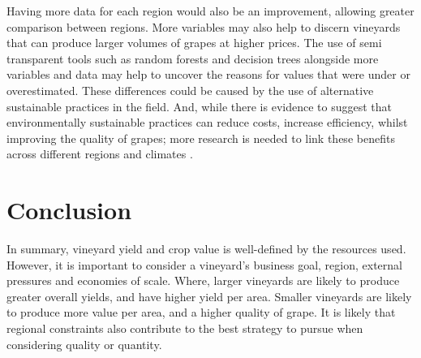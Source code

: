 \documentclass[review,12pt,authoryear]{elsarticle}
\begin{document}
\begin{linenumbers}
Having more data for each region would also be an improvement, allowing greater comparison between regions. More variables may also help to discern vineyards that can produce larger volumes of grapes at higher prices. The use of semi transparent tools such as random forests and decision trees alongside more variables and data may help to uncover the reasons for values that were under or overestimated. These differences could be caused by the use of alternative sustainable practices in the field. And, while there is evidence to suggest that environmentally sustainable practices can reduce costs, increase efficiency, whilst improving the quality of grapes; more research is needed to link these benefits across different regions and climates \citep{baianoOverviewSustainabilityWine2021,marianiSustainableWinegrowingCurrent2015,montalvo-falconSustainabilityResearchWine2023}.
\section{Conclusion}
In summary, vineyard yield and crop value is well-defined by the resources used. However, it is important to consider a vineyard's business goal, region, external pressures and economies of scale. Where, larger vineyards are likely to produce greater overall yields, and have higher yield per area. Smaller vineyards are likely to produce more value per area, and a higher quality of grape. It is likely that regional constraints also contribute to the best strategy to pursue when considering quality or quantity.
%




 \appendix



\end{linenumbers}
\end{document}
